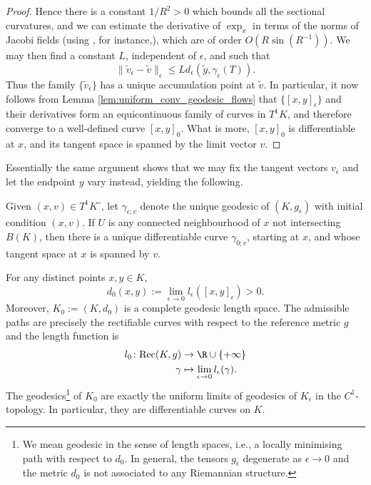 \documentclass[reqno,11pt]{amsart}
\begin{document}
\begin{proof}
    Hence there is a constant \( 1/R^2 > 0 \) which bounds all the sectional curvatures, and we can estimate the derivative of \( \exp_x \)  in terms of the norms of Jacobi fields (using \cite[Theorem 11.2]{lee2019introduction}, for instance,), which are of order \( O(R\sin(R^{-1})) \). 
    We may then find a constant \( L \), independent of \( \epsilon \), and such that
    \[
        \|\widetilde v_\epsilon - \widetilde v\|_\epsilon \leq Ld_\epsilon(\widetilde y, \gamma_\epsilon(T)).
    \]
    Thus the family \( \{\widetilde v_\epsilon \} \) has a unique accumulation point at \( \widetilde{v} \).
    In particular, it now follows from Lemma \ref{lem:uniform_conv_geodesic_flows} that \( \{ [x,y]_\epsilon\} \) and their derivatives form an equicontinuous family of curves in \( T^1K \), and therefore converge to a well-defined curve \( [x,y]_0 \).
    What is more, \( [x,y]_0 \) is differentiable at \(x\), and its tangent space is spanned by the limit vector \(v\).
\end{proof}
Essentially the same argument shows that we may fix the tangent vectors \(v_\epsilon\) and let the endpoint \(y\) vary instead, yielding the following.
\begin{corollary}
    Given \((x,v) \in T^1K^\circ\), let \(\gamma_{\epsilon;v}\) denote the unique geodesic of \((K, g_\epsilon)\) with initial condition \((x,v)\).
    If \(U\) is any connected neighbourhood of \(x\) not intersecting \(B(K)\), then there is a unique differentiable curve
    \(\gamma_{0;v}\), starting at \(x\), and whose tangent space at \(x\) is spanned by \(v\).
\end{corollary}
\begin{theorem}\label{thm:d_0_is_a_metric}
    For any distinct points \( x, y \in K \), 
    \[
        d_0(x,y) := \lim_{\epsilon\to 0}l_\epsilon([x,y]_\epsilon) > 0.
    \] 
    Moreover, \( K_0 := (K, d_0)  \) is a complete geodesic length space. 
    The admissible paths are precisely the rectifiable curves with respect to the reference metric \( g \) and the length function is 
\begin{align*}
    l_0\colon \mathrm{Rec}(K, g) &\to \R \cup \{+\infty\} \\
    \gamma &\mapsto \lim_{\epsilon \to 0}l_\epsilon(\gamma).
\end{align*}
The geodesics\footnote{
    We mean geodesic in the sense of length spaces, i.e., a locally minimising path with respect to \( d_0 \).
    In general, the tensors \( g_\epsilon \) degenerate as \( \epsilon \to 0 \) and the metric \( d_0 \) is not associated to any Riemannian structure.
    }
of \( K_0 \) are exactly the uniform limits of geodesics of \( K_\epsilon \) in the \( C^1 \)-topology.
In particular, they are differentiable curves on \(K\).
\end{theorem}
\end{document}
